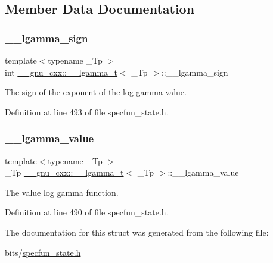 \subsection{Member Data Documentation}
\mbox{\label{struct____gnu__cxx_1_1____lgamma__t_a8aecdc9e5f69e729e96dc50f0c57b331}} 
\subsubsection{\texorpdfstring{\+\_\+\+\_\+lgamma\+\_\+sign}{\_\_lgamma\_sign}}
{\footnotesize\ttfamily template$<$typename \+\_\+\+Tp $>$ \\
int \hyperlink{struct____gnu__cxx_1_1____lgamma__t}{\+\_\+\+\_\+gnu\+\_\+cxx\+::\+\_\+\+\_\+lgamma\+\_\+t}$<$ \+\_\+\+Tp $>$\+::\+\_\+\+\_\+lgamma\+\_\+sign}



The sign of the exponent of the log gamma value. 



Definition at line 493 of file specfun\+\_\+state.\+h.

\mbox{\label{struct____gnu__cxx_1_1____lgamma__t_a916af5560acafd8dcf25c42fd28deef5}} 
\subsubsection{\texorpdfstring{\+\_\+\+\_\+lgamma\+\_\+value}{\_\_lgamma\_value}}
{\footnotesize\ttfamily template$<$typename \+\_\+\+Tp $>$ \\
\+\_\+\+Tp \hyperlink{struct____gnu__cxx_1_1____lgamma__t}{\+\_\+\+\_\+gnu\+\_\+cxx\+::\+\_\+\+\_\+lgamma\+\_\+t}$<$ \+\_\+\+Tp $>$\+::\+\_\+\+\_\+lgamma\+\_\+value}



The value log gamma function. 



Definition at line 490 of file specfun\+\_\+state.\+h.



The documentation for this struct was generated from the following file\+:\begin{DoxyCompactItemize}
\item 
bits/\hyperlink{specfun__state_8h}{specfun\+\_\+state.\+h}\end{DoxyCompactItemize}
